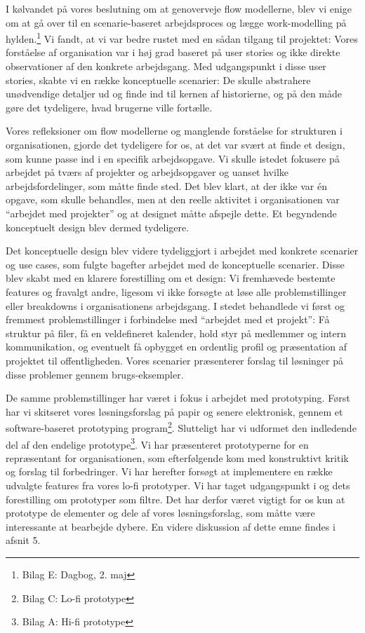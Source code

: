 I kølvandet på vores beslutning om at genoverveje flow modellerne, blev vi enige om at gå over til en scenarie-baseret arbejdsproces og lægge work-modelling på hylden.\footnote{Bilag E: Dagbog, 2. maj} Vi fandt, at vi var bedre rustet med en sådan tilgang til projektet: Vores forståelse af organisation var i høj grad baseret på user stories og ikke direkte observationer af den konkrete arbejdsgang. Med udgangspunkt i disse user stories, skabte vi en række konceptuelle scenarier: De skulle abstrahere unødvendige detaljer ud og finde ind til kernen af historierne, og på den måde gøre det tydeligere, hvad brugerne ville fortælle. 

Vores refleksioner om flow modellerne og manglende forståelse for strukturen i organisationen, gjorde det tydeligere for os, at det var svært at finde et design, som kunne passe ind i en specifik arbejdsopgave. Vi skulle istedet fokusere på arbejdet på tværs af projekter og arbejdsopgaver og uanset hvilke arbejdsfordelinger, som måtte finde sted. Det blev klart, at der ikke var én opgave, som skulle behandles, men at den reelle aktivitet i organisationen var “arbejdet med projekter” og at designet måtte afspejle dette. Et begyndende konceptuelt design blev dermed tydeligere.

Det konceptuelle design blev videre tydeliggjort i arbejdet med konkrete scenarier og use cases, som fulgte bagefter arbejdet med de konceptuelle scenarier. Disse blev skabt med en klarere forestilling om et design: Vi fremhævede bestemte features og fravalgt andre, ligesom vi ikke forsøgte at løse alle problemstillinger eller breakdowns i organisationens arbejdsgang. I stedet behandlede vi først og fremmest problemstillinger i forbindelse med “arbejdet med et projekt”: Få struktur på filer, få en veldefineret kalender, hold styr på medlemmer og intern kommunikation, og eventuelt få opbygget en ordentlig profil og præsentation af projektet til offentligheden. Vores scenarier præsenterer forslag til løsninger på disse problemer gennem brugs-eksempler.

De samme problemstillinger har været i fokus i arbejdet med prototyping. Først har vi skitseret vores løsningsforslag på papir og senere elektronisk, gennem et software-baseret prototyping program\footnote{Bilag C: Lo-fi prototype}. Slutteligt har vi udformet den indledende del af den endelige prototype\footnote{Bilag A: Hi-fi prototype}. Vi har præsenteret prototyperne for en repræsentant for organisationen, som efterfølgende kom med konstruktivt kritik og forslag til forbedringer. Vi har herefter forsøgt at implementere en række udvalgte features fra vores lo-fi prototyper. Vi har taget udgangspunkt i \citep{Lim} og dets forestilling om prototyper som filtre. Det har derfor været vigtigt for os kun at prototype de elementer og dele af vores løsningsforslag, som måtte være interessante at bearbejde dybere. En videre diskussion af dette emne findes i afsnit 5.

